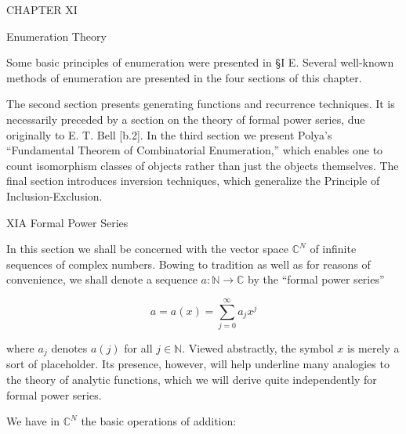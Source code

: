 CHAPTER XI

Enumeration Theory

Some basic principles of enumeration were presented in §I E. Several well-known methods of enumeration are presented in the four sections of this chapter.

The second section presents generating functions and recurrence techniques. It is necessarily preceded by a section on the theory of formal power series, due originally to E. T. Bell [b.2]. In the third section we present Polya’s “Fundamental Theorem of Combinatorial Enumeration,” which enables one to count isomorphism classes of objects rather than just the objects themselves. The final section introduces inversion techniques, which generalize the Principle of Inclusion-Exclusion.

XIA Formal Power Series

In this section we shall be concerned with the vector space $\mathbb{C}^N$ of infinite sequences of complex numbers. Bowing to tradition as well as for reasons of convenience, we shall denote a sequence $a: \mathbb{N} \rightarrow \mathbb{C}$ by the “formal power series”

$$a = a(x) = \sum_{j=0}^{\infty} a_j x^j$$

where $a_j$ denotes $a(j)$ for all $j \in \mathbb{N}$. Viewed abstractly, the symbol $x$ is merely a sort of placeholder. Its presence, however, will help underline many analogies to the theory of analytic functions, which we will derive quite independently for formal power series.

We have in $\mathbb{C}^N$ the basic operations of addition:
